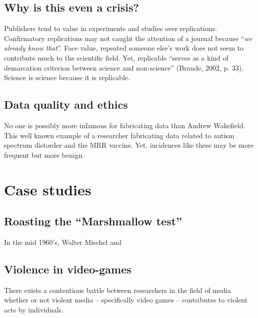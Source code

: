 \documentclass[man]{apa6}
\theoremstyle{definition}
\theoremstyle{definition}
\theoremstyle{definition}
\theoremstyle{remark}
\begin{document}
\hypertarget{why-is-this-even-a-crisis}{%
\subsection{Why is this even a
crisis?}\label{why-is-this-even-a-crisis}}

Publishers tend to value in experiments and studies over replications.
Confirmatory replications may not caught the attention of a journal
because \enquote{\emph{we already know that}}. Face value, repeated
someone else's work does not seem to contribute much to the scientific
field. Yet, replicable \enquote{serves as a kind of demarcation
criterion between science and non-science} (Braude, 2002, p. 33).
Science is science because it is replicable.

\hypertarget{data-quality-and-ethics}{%
\subsection{Data quality and ethics}\label{data-quality-and-ethics}}

No one is possibly more infamous for fabricating data than Andrew
Wakefield. This well known example of a researcher fabricating data
related to autism spectrum distorder and the MRR vaccine. Yet,
incidences like these may be more frequent but more benign.

\hypertarget{case-studies}{%
\section{Case studies}\label{case-studies}}

\hypertarget{roasting-the-marshmallow-test}{%
\subsection{\texorpdfstring{Roasting the \enquote{Marshmallow
test}}{Roasting the ``Marshmallow test''}}\label{roasting-the-marshmallow-test}}

In the mid 1960's, Walter Mischel and

\hypertarget{violence-in-video-games}{%
\subsection{Violence in video-games}\label{violence-in-video-games}}

There exists a contentious battle between researchers in the field of
media whether or not violent media -- specifically video games --
contributes to violent acts by individuals.
\end{document}
